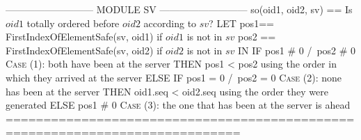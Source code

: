 \documentclass[preview, border={5pt 0pt 5pt 1pt}]{standalone}
\begin{document}
\begin{tla}
--------------------------- MODULE SV ---------------------------
so(oid1, oid2, sv) == \* Is $oid1$ totally ordered before $oid2$ according to $sv$?
    LET  pos1== FirstIndexOfElementSafe(sv, oid1)  if $oid1$ is not in $sv$
        pos2 == FirstIndexOfElementSafe(sv, oid2)  if $oid2$ is not in $sv$
    IN  IF pos1 # 0 /\ pos2 # 0 \* \textsc{Case} (1): both have been at the server
        THEN pos1 < pos2        \* using the order in which they arrived at the server
        ELSE IF pos1 = 0 /\ pos2 = 0  \* \textsc{Case} (2): none has been at the server
             THEN oid1.seq < oid2.seq \* using the order they were generated
             ELSE pos1 # 0 \* \textsc{Case} (3): the one that has been at the server is ahead
=============================================================================
\end{tla}
\begin{tlatex}
\@x{}\moduleLeftDash{}\moduleRightDash\@xx{}%
%
%
\@xx{}%
%
\@xx{}%
%
%
\@xx{}%
%
\@xx{}%
%
%
\@xx{}%
%
%
\@xx{}%
%
%
\@xx{}%
%
%
\@xx{}%
\@x{}\bottombar\@xx{}%
\end{tlatex}
\end{document}
